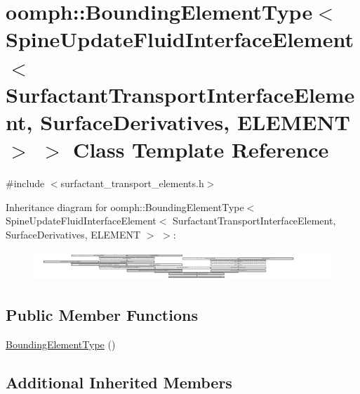 \hypertarget{classoomph_1_1BoundingElementType_3_01SpineUpdateFluidInterfaceElement_3_01SurfactantTransportIn0aa155ddfcfcc4520e061f144b3ee14d}{}\section{oomph\+:\+:Bounding\+Element\+Type$<$ Spine\+Update\+Fluid\+Interface\+Element$<$ Surfactant\+Transport\+Interface\+Element, Surface\+Derivatives, E\+L\+E\+M\+E\+NT $>$ $>$ Class Template Reference}
\label{classoomph_1_1BoundingElementType_3_01SpineUpdateFluidInterfaceElement_3_01SurfactantTransportIn0aa155ddfcfcc4520e061f144b3ee14d}


{\ttfamily \#include $<$surfactant\+\_\+transport\+\_\+elements.\+h$>$}

Inheritance diagram for oomph\+:\+:Bounding\+Element\+Type$<$ Spine\+Update\+Fluid\+Interface\+Element$<$ Surfactant\+Transport\+Interface\+Element, Surface\+Derivatives, E\+L\+E\+M\+E\+NT $>$ $>$\+:\begin{figure}[H]
\begin{center}
\leavevmode
\includegraphics[height=1.092683cm]{classoomph_1_1BoundingElementType_3_01SpineUpdateFluidInterfaceElement_3_01SurfactantTransportIn0aa155ddfcfcc4520e061f144b3ee14d}
\end{center}
\end{figure}
\subsection*{Public Member Functions}
\begin{DoxyCompactItemize}
\item 
\hyperlink{classoomph_1_1BoundingElementType_3_01SpineUpdateFluidInterfaceElement_3_01SurfactantTransportIn0aa155ddfcfcc4520e061f144b3ee14d_a91a5b9d653a80f4ae5cd871b17e21936}{Bounding\+Element\+Type} ()
\end{DoxyCompactItemize}
\subsection*{Additional Inherited Members}


